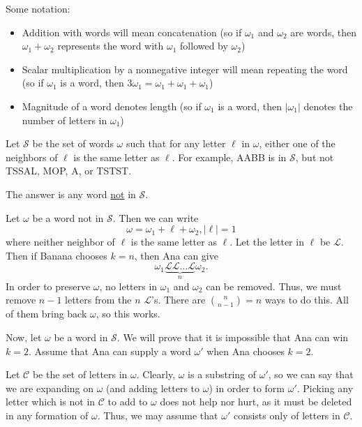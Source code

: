 Some notation:

\begin{itemize}
	
	\item Addition with words will mean concatenation (so if $\omega_1$ and $\omega_2$ are words, then $\omega_1+\omega_2$ represents the word with $\omega_1$ followed by $\omega_2$)
	
	\item Scalar multiplication by a nonnegative integer will mean repeating the word (so if $\omega_1$ is a word, then $3\omega_1=\omega_1+\omega_1+\omega_1$)
	
	\item Magnitude of a word denotes length (so if $\omega_1$ is a word, then $\left|\omega_1\right|$ denotes the number of letters in $\omega_1$)
	
\end{itemize}

Let $\mathcal{S}$ be the set of words $\omega$ such that for any letter $\ell$ in $\omega$, either one of the neighbors of $\ell$ is the same letter as $\ell$. For example, AABB is in $\mathcal{S}$, but not TSSAL, MOP, A, or TSTST.

The answer is any word \underline{not} in $\mathcal{S}$.

Let $\omega$ be a word not in $\mathcal{S}$. Then we can write \[\omega=\omega_1+\ell+\omega_2,\left|\ell\right|=1\] where neither neighbor of $\ell$ is the same letter as $\ell$. Let the letter in $\ell$ be $\mathcal{L}$. Then if Banana chooses $k=n$, then Ana can give \[\omega_1\underbrace{\mathcal{L}\mathcal{L}\ldots\mathcal{L}}_n\omega_2.\] In order to preserve $\omega$, no letters in $\omega_1$ and $\omega_2$ can be removed. Thus, we must remove $n-1$ letters from the $n$ $\mathcal{L}$'s. There are $\binom{n}{n-1}=n$ ways to do this. All of them bring back $\omega$, so this works.

Now, let $\omega$ be a word in $\mathcal{S}$. We will prove that it is impossible that Ana can win $k=2$. Assume that Ana can supply a word $\omega'$ when Ana chooses $k=2$.

Let $\mathcal{C}$ be the set of letters in $\omega$. Clearly, $\omega$ is a substring of $\omega'$, so we can say that we are expanding on $\omega$ (and adding letters to $\omega$) in order to form $\omega'$. Picking any letter which is not in $\mathcal{C}$ to add to $\omega$ does not help nor hurt, as it must be deleted in any formation of $\omega$. Thus, we may assume that $\omega'$ consists only of letters in $\mathcal{C}$.

